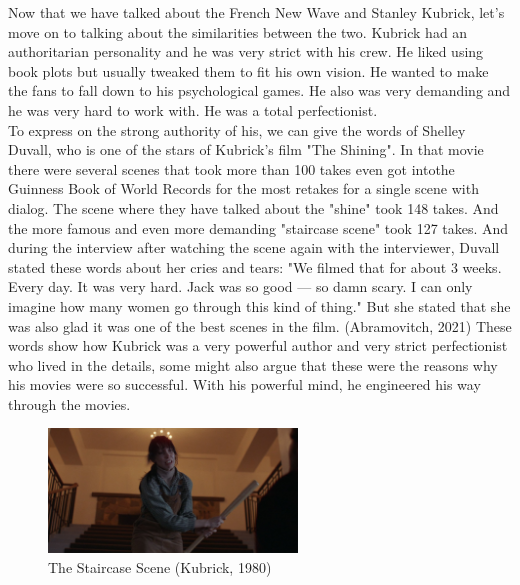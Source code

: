 \documentclass[12pt]{article}
\begin{document}
\par
Now that we have talked about the French New Wave and Stanley Kubrick, let's move on to talking about the similarities between the two.
Kubrick had an authoritarian personality and he was very strict with his crew.
He liked using book plots but usually tweaked them to fit his own vision. He wanted to make the fans to fall down to his psychological games.
He also was very demanding and he was very hard to work with. He was a total perfectionist.
\\
To express on the strong authority of his, we can give the words of Shelley Duvall, who is one of the stars of Kubrick's film "The Shining".
In that movie there were several scenes that took more than 100 takes even got intothe Guinness Book of World Records
for the most retakes for a single scene with dialog. The scene where they have talked about the "shine" took 148 takes. And the more
famous and even more demanding "staircase scene" took 127 takes. And during the interview after watching the scene again with the interviewer,
Duvall stated these words about her cries and tears: "We filmed that for about 3 weeks. Every day. It was very hard. Jack was so good — so damn scary.
I can only imagine how many women go through this kind of thing." But she stated that she was also glad it was one of the best scenes in the film. (Abramovitch, 2021)
These words show how Kubrick was a very powerful author and very strict perfectionist who lived in the details,
some might also argue that these were the reasons why his movies were so successful. With his powerful mind,
he engineered his way through the movies.
\\

\begin{figure}[h]
        \begin{center}
                \includegraphics[width=250px]{staircase}
                \caption{The Staircase Scene (Kubrick, 1980)}
        \end{center}
\end{figure}

\FloatBarrier
\end{document}
